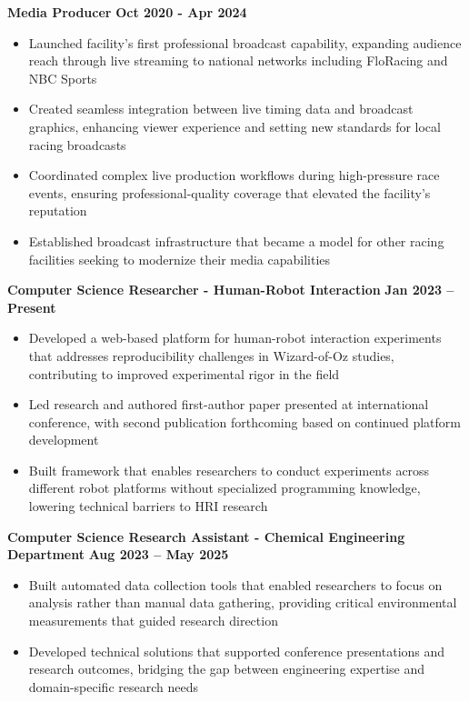 \documentclass{article}
\begin{document}
\textbf{Media Producer} \hfill \textbf{Oct 2020 - Apr 2024}
\begin{itemize}[noitemsep,topsep=2pt]
	\item Launched facility's first professional broadcast capability, expanding audience reach through live streaming to national networks including FloRacing and NBC Sports
	\item Created seamless integration between live timing data and broadcast graphics, enhancing viewer experience and setting new standards for local racing broadcasts
	\item Coordinated complex live production workflows during high-pressure race events, ensuring professional-quality coverage that elevated the facility's reputation
	\item Established broadcast infrastructure that became a model for other racing facilities seeking to modernize their media capabilities
\end{itemize}

 \hfill {}

\textbf{Computer Science Researcher - Human-Robot Interaction} \hfill \textbf{Jan 2023 – Present}
\begin{itemize}[noitemsep,topsep=2pt]
    \item Developed a web-based platform for human-robot interaction experiments that addresses reproducibility challenges in Wizard-of-Oz studies, contributing to improved experimental rigor in the field
    \item Led research and authored first-author paper presented at international conference, with second publication forthcoming based on continued platform development
    \item Built framework that enables researchers to conduct experiments across different robot platforms without specialized programming knowledge, lowering technical barriers to HRI research
\end{itemize}

\textbf{Computer Science Research Assistant - Chemical Engineering Department} \hfill \textbf{Aug 2023 – May 2025}
\begin{itemize}[noitemsep,topsep=2pt]
    \item Built automated data collection tools that enabled researchers to focus on analysis rather than manual data gathering, providing critical environmental measurements that guided research direction
    \item Developed technical solutions that supported conference presentations and research outcomes, bridging the gap between engineering expertise and domain-specific research needs
\end{itemize}
\end{document}
